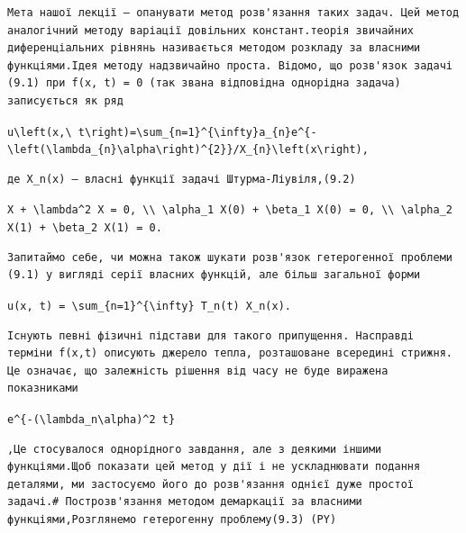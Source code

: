 \documentclass[
  ukrainian,
]{article}
\begin{document}
\begin{verbatim}
Мета нашої лекції — опанувати метод розв'язання таких задач. Цей метод аналогічний методу варіації довільних констант.теорія звичайних диференціальних рівнянь називається методом розкладу за власними функціями.Ідея методу надзвичайно проста. Відомо, що розв'язок задачі (9.1) при f(x, t) = 0 (так звана відповідна однорідна задача) записується як ряд
\end{verbatim}

\texttt{u\textbackslash{}left(x,\textbackslash{}\ t\textbackslash{}right)=\textbackslash{}sum\_\{n=1\}\^{}\{\textbackslash{}infty\}a\_\{n\}e\^{}\{-\textbackslash{}left(\textbackslash{}lambda\_\{n\}\textbackslash{}alpha\textbackslash{}right)\^{}\{2\}\}/X\_\{n\}\textbackslash{}left(x\textbackslash{}right),}

\begin{verbatim}
де X_n(x) — власні функції задачі Штурма-Ліувіля,(9.2)
\end{verbatim}

\texttt{X\textquotesingle{}\textquotesingle{}\ +\ \textbackslash{}lambda\^{}2\ X\ =\ 0,\ \textbackslash{}\textbackslash{}\ \textbackslash{}alpha\_1\ X\textquotesingle{}(0)\ +\ \textbackslash{}beta\_1\ X(0)\ =\ 0,\ \textbackslash{}\textbackslash{}\ \textbackslash{}alpha\_2\ X\textquotesingle{}(1)\ +\ \textbackslash{}beta\_2\ X(1)\ =\ 0.}

\begin{verbatim}
Запитаймо себе, чи можна також шукати розв'язок гетерогенної проблеми (9.1) у вигляді серії власних функцій, але більш загальної форми
\end{verbatim}

\texttt{u(x,\ t)\ =\ \textbackslash{}sum\_\{n=1\}\^{}\{\textbackslash{}infty\}\ T\_n(t)\ X\_n(x).}

\begin{verbatim}
Існують певні фізичні підстави для такого припущення. Насправді терміни f(x,t) описують джерело тепла, розташоване всередині стрижня. Це означає, що залежність рішення від часу не буде виражена показниками
\end{verbatim}

\texttt{e\^{}\{-(\textbackslash{}lambda\_n\textbackslash{}alpha)\^{}2\ t\}}

\begin{verbatim}
,Це стосувалося однорідного завдання, але з деякими іншими функціями.Щоб показати цей метод у дії і не ускладнювати подання деталями, ми застосуємо його до розв'язання однієї дуже простої задачі.# Построзв'язання методом демаркації за власними функціями,Розглянемо гетерогенну проблему(9.3) (PY)
\end{verbatim}
\end{document}
